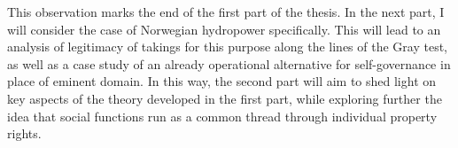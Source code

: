 This observation marks the end of the first part of the thesis. In the next part, I will consider the case of Norwegian hydropower specifically. This will lead to an analysis of legitimacy of takings for this purpose along the lines of the Gray test, as well as a case study of an already operational alternative for self-governance in place of eminent domain. In this way, the second part will aim to shed light on key aspects of the theory developed in the first part, while exploring further the idea that social functions run as a common thread through individual property rights.



